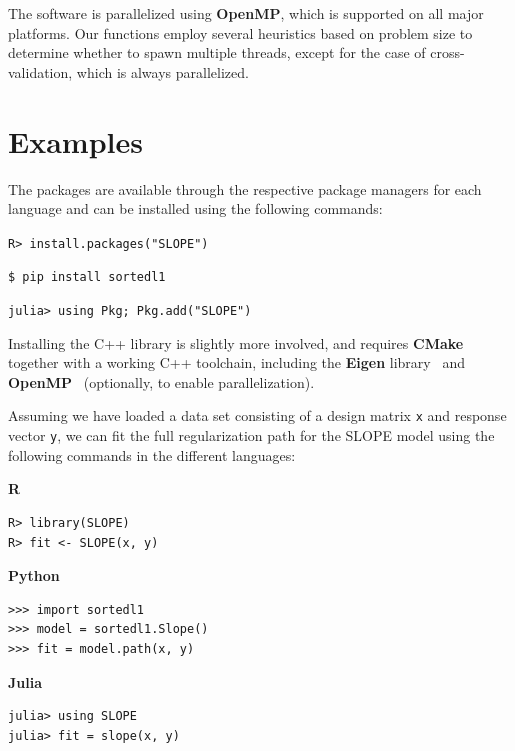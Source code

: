 \documentclass[a4paper,fleqn]{cas-sc}
\begin{document}
The software is parallelized using \textbf{OpenMP}, which is supported on all
major platforms. Our functions employ several heuristics based on problem size
to determine whether to spawn multiple threads, except for the case of
cross-validation, which is always parallelized.

\section{Examples}
\label{sec:examples}

The packages are available through the respective package managers for each
language and can be installed using the following commands:
%
\begin{description}[labelwidth=8ex]
  \item[\textsf{R}] \texttt{R> install.packages("SLOPE")}
  \item[\textsf{Python}] \texttt{\$ pip install sortedl1}
  \item[\textsf{Julia}] \texttt{julia> using Pkg; Pkg.add("SLOPE")}
\end{description}

Installing the \textsf{C++} library is slightly more involved, and requires
\textbf{CMake} \citep{kitware2025} together with a working \textsf{C++}
toolchain, including the \textbf{Eigen} library~\citep{guennebaud2010a} and
\textbf{OpenMP}~\citep{dagum1998} (optionally, to enable parallelization).

Assuming we have loaded a data set consisting of a design matrix \texttt{x} and
response vector \texttt{y}, we can fit the full regularization path for the
SLOPE model using the following commands in the different languages:

\vspace{1em}

\noindent\begin{minipage}[t]{0.24\textwidth}%
  \textbf{\textsf{R}}
  \begin{Verbatim}
R> library(SLOPE)
R> fit <- SLOPE(x, y)
  \end{Verbatim}
\end{minipage}
\hfill
\begin{minipage}[t]{0.33\textwidth}%
  \textbf{\textsf{Python}}
  \begin{Verbatim}
>>> import sortedl1
>>> model = sortedl1.Slope()
>>> fit = model.path(x, y)
  \end{Verbatim}
\end{minipage}
\hfill
\begin{minipage}[t]{0.32\textwidth}%
  \textbf{\textsf{Julia}}
  \begin{Verbatim}
julia> using SLOPE
julia> fit = slope(x, y)
  \end{Verbatim}
\end{minipage}
\end{document}
